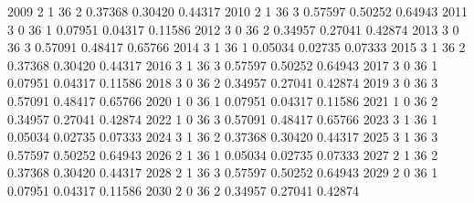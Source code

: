 \documentclass{article}
\begin{document}
\begin{Woutput}
2009      2       1      36       2       0.37368    0.30420    0.44317
2010      2       1      36       3       0.57597    0.50252    0.64943
2011      3       0      36       1       0.07951    0.04317    0.11586
2012      3       0      36       2       0.34957    0.27041    0.42874
2013      3       0      36       3       0.57091    0.48417    0.65766
2014      3       1      36       1       0.05034    0.02735    0.07333
2015      3       1      36       2       0.37368    0.30420    0.44317
2016      3       1      36       3       0.57597    0.50252    0.64943
2017      3       0      36       1       0.07951    0.04317    0.11586
2018      3       0      36       2       0.34957    0.27041    0.42874
2019      3       0      36       3       0.57091    0.48417    0.65766
2020      1       0      36       1       0.07951    0.04317    0.11586
2021      1       0      36       2       0.34957    0.27041    0.42874
2022      1       0      36       3       0.57091    0.48417    0.65766
2023      3       1      36       1       0.05034    0.02735    0.07333
2024      3       1      36       2       0.37368    0.30420    0.44317
2025      3       1      36       3       0.57597    0.50252    0.64943
2026      2       1      36       1       0.05034    0.02735    0.07333
2027      2       1      36       2       0.37368    0.30420    0.44317
2028      2       1      36       3       0.57597    0.50252    0.64943
2029      2       0      36       1       0.07951    0.04317    0.11586
2030      2       0      36       2       0.34957    0.27041    0.42874


\end{Woutput}
\end{document}
